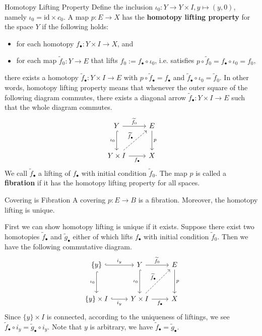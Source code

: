 \documentclass{report}
\begin{document}
\begin{definition}{Homotopy Lifting Property}{}
	Define the inclusion $\iota_0:Y\to Y\times I,y\mapsto(y,0)$, namely $\iota_0=\mathrm{id}\times c_0$. A map $p: E \rightarrow X$ has the \textbf{homotopy lifting property} for the space $Y$ if the following holds: 
	\begin{itemize}
		\item for each homotopy $f_\bullet: Y \times I \rightarrow X$, and
		\item for each map $\widetilde{f}_0: Y \rightarrow E$ that lifts $f_0:=f_{\bullet} \circ\iota_0$, i.e. satisfies $p \circ \widetilde{f}_0=f_{\bullet} \circ\iota_0=f_0$,
	\end{itemize}
	there exists a homotopy $\widetilde{f}_{\bullet}: Y \times I \rightarrow E$ with $p \circ \widetilde{f}_{\bullet}=f_{\bullet}$ and $ \widetilde{f}_{\bullet} \circ \iota_0=\widetilde{f}_0$. In other words, homotopy lifting property means that whenever the outer square of the following diagram commutes, there exists a diagonal arrow $\widetilde{f}_{\bullet}:Y\times I\to E$ such that the whole diagram commutes.
	\[
	\begin{tikzcd}[ampersand replacement=\&]
		Y \arrow[r, "\widetilde{f}_0"] \arrow[d, "\iota_0"', hook]                      \& E \arrow[d, "p"] \\ [+10pt]
		Y\times I \arrow[r, "f_\bullet"'] \arrow[ru, "\widetilde{f}_{\bullet}", dashed] \& X               
	\end{tikzcd}
	\]
	We call $\widetilde{f}_{\bullet}$ a lifting of $f_{\bullet}$ with initial condition $\widetilde{f}_0$. The map $p$ is called a \textbf{fibration} if it has the homotopy lifting property for all spaces.
\end{definition}


\begin{theorem}{Covering is Fibration}{}
	A covering $p: E \rightarrow B$ is a fibration. Moreover, the homotopy lifting is unique.
\end{theorem}

\begin{prf}
	First we can show homotopy lifting is unique if it exists. Suppose there exist two homotopies $\widetilde{f}_{\bullet}$ and $\widetilde{g}_{\bullet}$ either of which lifts $f_{\bullet}$ with initial condition $\widetilde{f}_0$. Then we have the following commutative diagram.
	\[
	\begin{tikzcd}[ampersand replacement=\&]
		\{y\}\arrow[r, "i_y", hook]\arrow[d, "\iota_0"', hook]\&Y \arrow[r, "\widetilde{f}_0"] \arrow[d, "\iota_0"', hook]                      \& E \arrow[d, "p"] \\ [+13pt]
		\{y\} \arrow[r, "i_y"', hook]  \times I\&Y\times I \arrow[r, "f_\bullet"'] \arrow[ru, "\widetilde{f}_{\bullet}", dashed] \& X               
	\end{tikzcd}
	\]
	Since $\{y\}\times I$ is connected, according to the uniqueness of liftings, we see $\widetilde{f}_{\bullet}\circ i_y=\widetilde{g}_{\bullet}\circ i_y$. Note that $y$ is arbitrary, we have $\widetilde{f}_{\bullet}=\widetilde{g}_{\bullet}$.
\end{prf}
\end{document}
